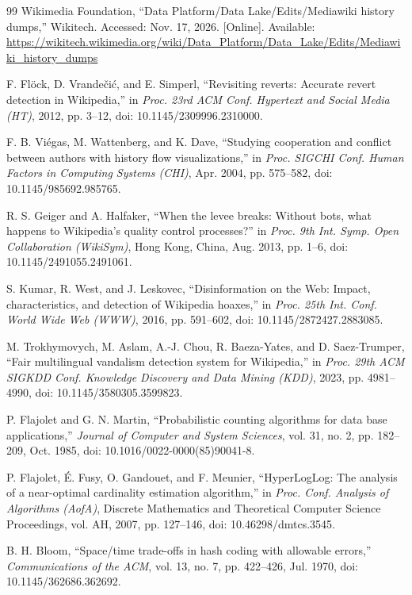 \begin{thebibliography}{99}
Wikimedia Foundation, ``Data Platform/Data Lake/Edits/Mediawiki history dumps,'' Wikitech. Accessed: Nov. 17, 2026. [Online]. Available: \url{https://wikitech.wikimedia.org/wiki/Data_Platform/Data_Lake/Edits/Mediawiki_history_dumps}

F. Fl\"ock, D. Vrande\v{c}i\'c, and E. Simperl, ``Revisiting reverts: Accurate revert detection in Wikipedia,'' in \emph{Proc. 23rd ACM Conf. Hypertext and Social Media (HT)}, 2012, pp. 3--12, doi: 10.1145/2309996.2310000.

F. B. Vi\'egas, M. Wattenberg, and K. Dave, ``Studying cooperation and conflict between authors with history flow visualizations,'' in \emph{Proc. SIGCHI Conf. Human Factors in Computing Systems (CHI)}, Apr. 2004, pp. 575--582, doi: 10.1145/985692.985765.

R. S. Geiger and A. Halfaker, ``When the levee breaks: Without bots, what happens to Wikipedia's quality control processes?'' in \emph{Proc. 9th Int. Symp. Open Collaboration (WikiSym)}, Hong Kong, China, Aug. 2013, pp. 1--6, doi: 10.1145/2491055.2491061.

S. Kumar, R. West, and J. Leskovec, ``Disinformation on the Web: Impact, characteristics, and detection of Wikipedia hoaxes,'' in \emph{Proc. 25th Int. Conf. World Wide Web (WWW)}, 2016, pp. 591--602, doi: 10.1145/2872427.2883085.

M. Trokhymovych, M. Aslam, A.-J. Chou, R. Baeza-Yates, and D. Saez-Trumper, ``Fair multilingual vandalism detection system for Wikipedia,'' in \emph{Proc. 29th ACM SIGKDD Conf. Knowledge Discovery and Data Mining (KDD)}, 2023, pp. 4981--4990, doi: 10.1145/3580305.3599823.

P. Flajolet and G. N. Martin, ``Probabilistic counting algorithms for data base applications,'' \emph{Journal of Computer and System Sciences}, vol. 31, no. 2, pp. 182--209, Oct. 1985, doi: 10.1016/0022-0000(85)90041-8.

P. Flajolet, \'E. Fusy, O. Gandouet, and F. Meunier, ``HyperLogLog: The analysis of a near-optimal cardinality estimation algorithm,'' in \emph{Proc. Conf. Analysis of Algorithms (AofA)}, Discrete Mathematics and Theoretical Computer Science Proceedings, vol. AH, 2007, pp. 127--146, doi: 10.46298/dmtcs.3545.

B. H. Bloom, ``Space/time trade-offs in hash coding with allowable errors,'' \emph{Communications of the ACM}, vol. 13, no. 7, pp. 422--426, Jul. 1970, doi: 10.1145/362686.362692.


\end{thebibliography}
